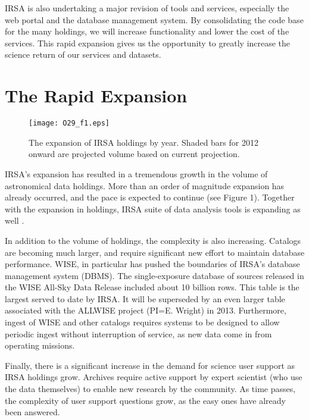 \documentclass[11pt,twoside]{article}
\begin{document}
IRSA is also undertaking a
major revision of tools and services, especially the web portal and
the database management system. By consolidating the code base for the
many holdings, we will increase functionality and lower the cost of
the services. This rapid expansion gives us the opportunity to greatly
increase the science return of our services and datasets.




\section{The Rapid Expansion}

\begin{figure}[t]

\centering
\texttt{[image: O29\_f1.eps]}
\caption{The expansion of IRSA holdings by year.  Shaded  bars for
  2012 onward are projected volume based on current projection.}

\end{figure}


IRSA's expansion has resulted in a tremendous growth in the volume of
astronomical data holdings.  More than an order of magnitude expansion
has already occurred, and the pace is expected to continue (see Figure
1).  Together with the expansion in holdings, IRSA suite of data analysis
tools is expanding as well \citep{teplitz12}.

In addition to the volume of holdings, the complexity is also
increasing.  Catalogs are becoming much larger, and require
significant new effort to maintain database performance.  WISE, in
particular has pushed the boundaries of IRSA's database management
system (DBMS).  The single-exposure database of sources released in
the WISE All-Sky Data Release included about 10 billion
rows.  This table is the largest served to date by IRSA. It will be
superseded by an even larger table associated with the ALLWISE project
(PI=E. Wright) in 2013.  Furthermore, ingest of WISE and other catalogs requires systems to be
designed to allow periodic ingest without interruption of service, as
new data come in from operating missions.  

Finally, there is a significant increase in the demand for
science user support as IRSA holdings grow.  Archives require active
support by expert scientist (who use the data themselves) to enable
new research by the community.  As time passes, the complexity of user
support questions grow, as the easy ones have already been answered.
\end{document}
